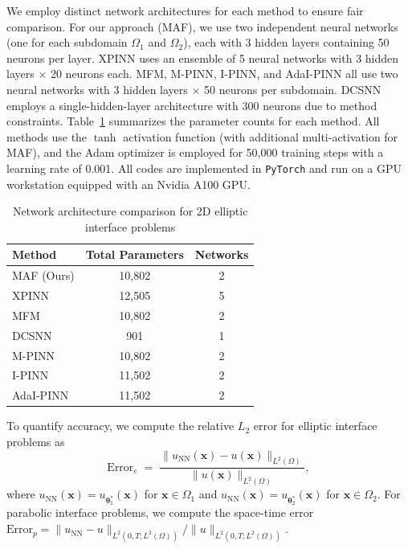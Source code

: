 \documentclass{article}
\begin{document}
We employ distinct network architectures for each method to ensure fair comparison. For our approach (MAF), we use two independent neural networks (one for each subdomain $\Omega_1$ and $\Omega_2$), each with 3 hidden layers containing 50 neurons per layer. XPINN uses an ensemble of 5 neural networks with 3 hidden layers $\times$ 20 neurons each. MFM, M-PINN, I-PINN, and AdaI-PINN all use two neural networks with 3 hidden layers $\times$ 50 neurons per subdomain. DCSNN employs a single-hidden-layer architecture with 300 neurons due to method constraints. Table~\ref{tab:computational_cost} summarizes the parameter counts for each method. All methods use the $\tanh$ activation function (with additional multi-activation for MAF), and the Adam optimizer is employed for 50,000 training steps with a learning rate of 0.001. All codes are implemented in \texttt{PyTorch} and run on a GPU workstation equipped with an Nvidia A100 GPU.

\begin{table}[H]
    \centering
    \caption{Network architecture comparison for 2D elliptic interface problems}
    \label{tab:computational_cost}
    \begin{tabular}{|l|c|c|}
        \hline
        \textbf{Method} & \textbf{Total Parameters} & \textbf{Networks} \\
        \hline
        MAF (Ours) & 10,802 & 2 \\
        XPINN & 12,505 & 5 \\
        MFM & 10,802 & 2 \\
        DCSNN & 901 & 1 \\
        M-PINN & 10,802 & 2 \\
        I-PINN & 11,502 & 2 \\
        AdaI-PINN & 11,502 & 2 \\
        \hline
    \end{tabular}
\end{table}

To quantify accuracy, we compute the relative $L_2$ error for elliptic interface problems as
\begin{equation}\label{errore}
    \text{Error}_{e}
    \;=\; 
    \frac{ \|u_{\text{NN}}(\boldsymbol{x}) - u(\boldsymbol{x})\|_{L^2(\Omega)}}{\|u(\boldsymbol{x})\|_{L^2(\Omega)}},
\end{equation}
where $u_{\text{NN}}(\boldsymbol{x}) = u_{\boldsymbol{\theta}_1^*}(\boldsymbol{x})$ for $\boldsymbol{x} \in \Omega_1$ and $u_{\text{NN}}(\boldsymbol{x}) = u_{\boldsymbol{\theta}_2^*}(\boldsymbol{x})$ for $\boldsymbol{x} \in \Omega_2$. For parabolic interface problems, we compute the space-time error $\text{Error}_{p} = \|u_{\text{NN}} - u\|_{L^2(0,T;L^2(\Omega))} / \|u\|_{L^2(0,T;L^2(\Omega))}$.
\end{document}
